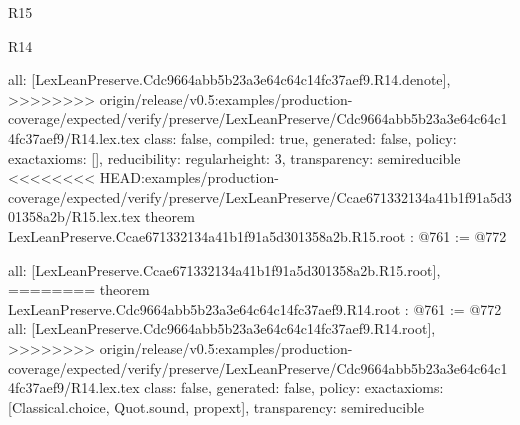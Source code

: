 \begin{lexlean}{R15}
\begin{lexlean}{R14}
\begin{coremodule}
{{{{{{{{{{{{  all: [LexLeanPreserve.Cdc9664abb5b23a3e64c64c14fc37aef9.R14.denote],
>>>>>>>> origin/release/v0.5:examples/production-coverage/expected/verify/preserve/LexLeanPreserve/Cdc9664abb5b23a3e64c64c14fc37aef9/R14.lex.tex
  class: false,
  compiled: true,
  generated: false,
  policy: exact{axioms: []},
  reducibility: regular{height: 3},
  transparency: semireducible
}
<<<<<<<< HEAD:examples/production-coverage/expected/verify/preserve/LexLeanPreserve/Ccae671332134a41b1f91a5d301358a2b/R15.lex.tex
theorem LexLeanPreserve.Ccae671332134a41b1f91a5d301358a2b.R15.root : @761 := @772 {
  all: [LexLeanPreserve.Ccae671332134a41b1f91a5d301358a2b.R15.root],
========
theorem LexLeanPreserve.Cdc9664abb5b23a3e64c64c14fc37aef9.R14.root : @761 := @772 {
  all: [LexLeanPreserve.Cdc9664abb5b23a3e64c64c14fc37aef9.R14.root],
>>>>>>>> origin/release/v0.5:examples/production-coverage/expected/verify/preserve/LexLeanPreserve/Cdc9664abb5b23a3e64c64c14fc37aef9/R14.lex.tex
  class: false,
  generated: false,
  policy: exact{axioms: [Classical.choice, Quot.sound, propext]},
  transparency: semireducible
}

}}}}}}}}}}}}
\end{coremodule}
\end{lexlean}
\end{lexlean}

